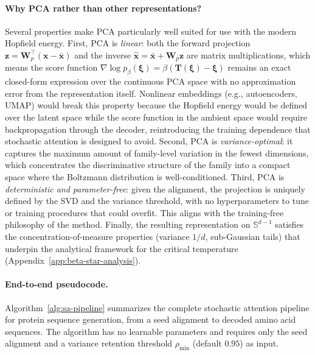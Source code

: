 \paragraph{Why PCA rather than other representations?}
Several properties make PCA particularly well suited for use with the modern Hopfield energy. First, PCA is \emph{linear}: both the forward projection $\mathbf{z} = \mathbf{W}_p^\top(\mathbf{x} - \bar{\mathbf{x}})$ and the inverse $\hat{\mathbf{x}} = \bar{\mathbf{x}} + \mathbf{W}_p\mathbf{z}$ are matrix multiplications, which means the score function $\nabla \log p_\beta(\boldsymbol{\xi}) = \beta(\mathbf{T}(\boldsymbol{\xi}) - \boldsymbol{\xi})$ remains an exact closed-form expression over the continuous PCA space with no approximation error from the representation itself. Nonlinear embeddings (e.g., autoencoders, UMAP) would break this property because the Hopfield energy would be defined over the latent space while the score function in the ambient space would require backpropagation through the decoder, reintroducing the training dependence that stochastic attention is designed to avoid. Second, PCA is \emph{variance-optimal}: it captures the maximum amount of family-level variation in the fewest dimensions, which concentrates the discriminative structure of the family into a compact space where the Boltzmann distribution is well-conditioned. Third, PCA is \emph{deterministic and parameter-free}: given the alignment, the projection is uniquely defined by the SVD and the variance threshold, with no hyperparameters to tune or training procedures that could overfit. This aligns with the training-free philosophy of the method. Finally, the resulting representation on $\mathbb{S}^{d-1}$ satisfies the concentration-of-measure properties (variance $1/d$, sub-Gaussian tails) that underpin the analytical framework for the critical temperature (Appendix~\ref{app:beta-star-analysis}).

\paragraph{End-to-end pseudocode.}
Algorithm~\ref{alg:sa-pipeline} summarizes the complete stochastic attention pipeline for protein sequence generation, from a seed alignment to decoded amino acid sequences. The algorithm has no learnable parameters and requires only the seed alignment and a variance retention threshold $\rho_{\min}$ (default $0.95$) as input.

